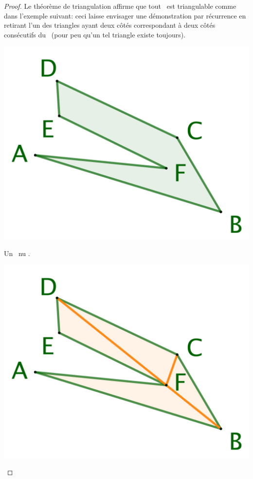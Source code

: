 \begin{proof}
	Le théorème de triangulation affirme que tout \ngone\ est triangulable comme dans l'exemple suivant: ceci laisse envisager une démonstration par récurrence en retirant l'un des triangles ayant deux côtés correspondant à deux côtés consécutifs du \ngone\ (pour peu qu'un tel triangle existe toujours).


    \begin{multicols}{3}
        \small\itshape
        \begin{center}
            \includegraphics[scale=.35]{content/polygon/alg-area/triangulation-1.png}

            \smallskip
            Un \ngone\ \og nu \fg.
        \end{center}


        \begin{center}
            \includegraphics[scale=.35]{content/polygon/alg-area/triangulation-2.png}


\end{center}
\end{multicols}
\end{proof}
